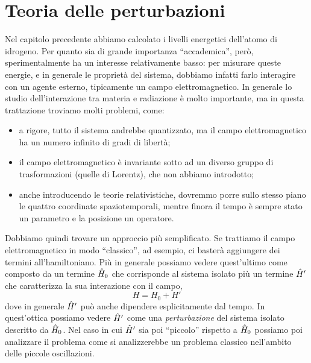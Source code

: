 \chapter{Teoria delle perturbazioni}
Nel capitolo precedente abbiamo calcolato i livelli energetici dell'atomo di idrogeno.
Per quanto sia di grande importanza ``accademica'', però, sperimentalmente ha un interesse relativamente basso: per misurare queste energie, e in generale le proprietà del sistema, dobbiamo infatti farlo interagire con un agente esterno, tipicamente un campo elettromagnetico.
In generale lo studio dell'interazione tra materia e radiazione è molto importante, ma in questa trattazione troviamo molti problemi, come:
\begin{itemize}
	\item a rigore, tutto il sistema andrebbe quantizzato, ma il campo elettromagnetico ha un numero infinito di gradi di libertà;
	\item il campo elettromagnetico è invariante sotto ad un diverso gruppo di trasformazioni (quelle di Lorentz), che non abbiamo introdotto;
	\item anche introducendo le teorie relativistiche, dovremmo porre sullo stesso piano le quattro coordinate spaziotemporali, mentre finora il tempo è sempre stato un parametro e la posizione un operatore.
\end{itemize}
Dobbiamo quindi trovare un approccio più semplificato.
Se trattiamo il campo elettromagnetico in modo ``classico'', ad esempio, ci basterà aggiungere dei termini all'hamiltoniano.
Più in generale possiamo vedere quest'ultimo come composto da un termine $\hat{H}_0$ che corrisponde al sistema isolato più un termine $\hat{H}'$ che caratterizza la sua interazione con il campo,
\begin{equation}
	H=H_0+H'
	\label{eq:perturbazione}
\end{equation}
dove in generale $\hat{H}'$ può anche dipendere esplicitamente dal tempo.
In quest'ottica possiamo vedere $\hat{H}'$ come una \emph{perturbazione} del sistema isolato descritto da $\hat{H}_0$.
Nel caso in cui $\hat{H}'$ sia poi ``piccolo'' rispetto a $\hat{H}_0$ possiamo poi analizzare il problema come si analizzerebbe un problema classico nell'ambito delle piccole oscillazioni.

